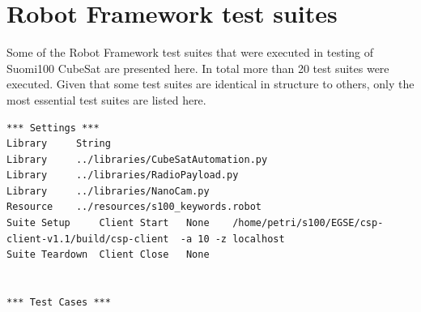 \documentclass[english,12pt,a4paper,pdftex,elec,utf8]{aaltothesis}
\begin{document}
\section{Robot Framework test suites\label{LiiteB}}
Some of the Robot Framework test suites that were executed in testing of Suomi100 CubeSat are presented here. In total more than 20 test suites were executed. Given that some test suites are identical in structure to others, only the most essential test suites are listed here.
\begin{verbatim}
*** Settings ***
Library		String
Library		../libraries/CubeSatAutomation.py
Library		../libraries/RadioPayload.py
Library		../libraries/NanoCam.py
Resource	../resources/s100_keywords.robot
Suite Setup		Client Start   None    /home/petri/s100/EGSE/csp-client-v1.1/build/csp-client  -a 10 -z localhost
Suite Teardown	Client Close   None


*** Test Cases ***


\end{verbatim}
\end{document}
